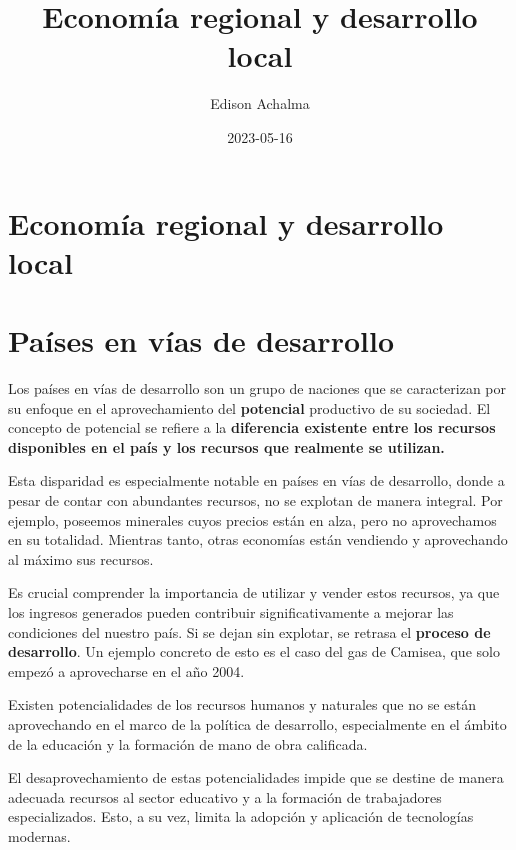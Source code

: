 \documentclass[
  jou,
  floatsintext,
  longtable,
  a4paper,
  nolmodern,
  notxfonts,
  notimes,
  12pt,
  colorlinks=true,linkcolor=blue,citecolor=blue,urlcolor=blue]{apa7}
\title{Economía regional y desarrollo local}
\author{Edison Achalma}
\affiliation{
{Escuela Profesional de Economía, Universidad Nacional de San Cristóbal
de Huamanga}}
\date{2023-05-16}
\begin{document}
\maketitle


\hypertarget{toc}{}
\tableofcontents
\newpage
\section[Introduction]{Economía regional y desarrollo local}

\setcounter{secnumdepth}{3}

\setlength\LTleft{0pt}




\section{Países en vías de
desarrollo}\label{pauxedses-en-vuxedas-de-desarrollo}

Los países en vías de desarrollo son un grupo de naciones que se
caracterizan por su enfoque en el aprovechamiento del \textbf{potencial}
productivo de su sociedad. El concepto de potencial se refiere a la
\textbf{diferencia existente entre los recursos disponibles en el país y
los recursos que realmente se utilizan.}

Esta disparidad es especialmente notable en países en vías de
desarrollo, donde a pesar de contar con abundantes recursos, no se
explotan de manera integral. Por ejemplo, poseemos minerales cuyos
precios están en alza, pero no aprovechamos en su totalidad. Mientras
tanto, otras economías están vendiendo y aprovechando al máximo sus
recursos.

Es crucial comprender la importancia de utilizar y vender estos
recursos, ya que los ingresos generados pueden contribuir
significativamente a mejorar las condiciones del nuestro país. Si se
dejan sin explotar, se retrasa el \textbf{proceso de desarrollo}. Un
ejemplo concreto de esto es el caso del gas de Camisea, que solo empezó
a aprovecharse en el año 2004.

Existen potencialidades de los recursos humanos y naturales que no se
están aprovechando en el marco de la política de desarrollo,
especialmente en el ámbito de la educación y la formación de mano de
obra calificada.

El desaprovechamiento de estas potencialidades impide que se destine de
manera adecuada recursos al sector educativo y a la formación de
trabajadores especializados. Esto, a su vez, limita la adopción y
aplicación de tecnologías modernas.
\end{document}
